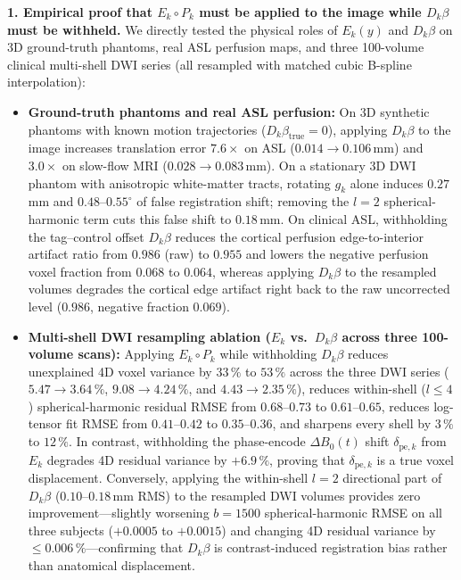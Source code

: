 \documentclass[11pt]{article}
\begin{document}
\textbf{1. Empirical proof that $E_k \circ P_k$ must be applied to the image while $D_k\beta$ must be withheld.}
We directly tested the physical roles of $E_k(y)$ and $D_k\beta$ on 3D ground-truth phantoms, real ASL perfusion maps, and three 100-volume clinical multi-shell DWI series (all resampled with matched cubic B-spline interpolation):
\begin{itemize}
\item \textbf{Ground-truth phantoms and real ASL perfusion:} On 3D synthetic phantoms with known motion trajectories ($D_k\beta_{\text{true}} = 0$), applying $D_k\beta$ to the image increases translation error $7.6\times$ on ASL ($0.014 \to 0.106$\,mm) and $3.0\times$ on slow-flow MRI ($0.028 \to 0.083$\,mm). On a stationary 3D DWI phantom with anisotropic white-matter tracts, rotating $g_k$ alone induces $0.27$\,mm and $0.48\text{--}0.55^\circ$ of false registration shift; removing the $l = 2$ spherical-harmonic term cuts this false shift to $0.18$\,mm. On clinical ASL, withholding the tag--control offset $D_k\beta$ reduces the cortical perfusion edge-to-interior artifact ratio from $0.986$ (raw) to $0.955$ and lowers the negative perfusion voxel fraction from $0.068$ to $0.064$, whereas applying $D_k\beta$ to the resampled volumes degrades the cortical edge artifact right back to the raw uncorrected level ($0.986$, negative fraction $0.069$).
\item \textbf{Multi-shell DWI resampling ablation ($E_k$ vs.\ $D_k\beta$ across three 100-volume scans):} Applying $E_k \circ P_k$ while withholding $D_k\beta$ reduces unexplained 4D voxel variance by $33\,\%$ to $53\,\%$ across the three DWI series ($5.47 \to 3.64\,\%$, $9.08 \to 4.24\,\%$, and $4.43 \to 2.35\,\%$), reduces within-shell ($l \le 4$) spherical-harmonic residual RMSE from $0.68\text{--}0.73$ to $0.61\text{--}0.65$, reduces log-tensor fit RMSE from $0.41\text{--}0.42$ to $0.35\text{--}0.36$, and sharpens every shell by $3\,\%$ to $12\,\%$. In contrast, withholding the phase-encode $\Delta B_0(t)$ shift $\delta_{\text{pe},k}$ from $E_k$ degrades 4D residual variance by $+6.9\,\%$, proving that $\delta_{\text{pe},k}$ is a true voxel displacement. Conversely, applying the within-shell $l = 2$ directional part of $D_k\beta$ ($0.10\text{--}0.18$\,mm RMS) to the resampled DWI volumes provides zero improvement—slightly worsening $b = 1500$ spherical-harmonic RMSE on all three subjects ($+0.0005$ to $+0.0015$) and changing 4D residual variance by $\le 0.006\,\%$—confirming that $D_k\beta$ is contrast-induced registration bias rather than anatomical displacement.
\end{itemize}
\end{document}
